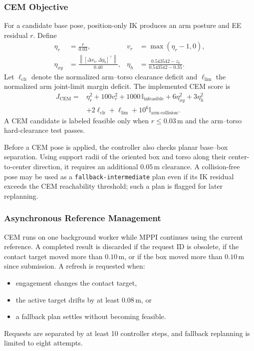 \documentclass[11pt,a4paper]{article}
\newcommand{\norm}[1]{\left\lVert #1 \right\rVert}
\newcommand{\code}[1]{\texttt{#1}}
\begin{document}
\subsubsection{CEM Objective}

For a candidate base pose, position-only IK produces an arm posture and EE
residual $r$. Define
\begin{align}
  \eta_r&=\frac{r}{0.03},&
  v_r&=\max(\eta_r-1,0),\\
  \eta_{xy}&=\frac{\norm{[\Delta x_b,\Delta y_b]^\top}}{0.40},&
  \eta_h&=\frac{0.543542-z_b}{0.543542-0.35}.
\end{align}
Let $\ell_{\mathrm{clr}}$ denote the normalized arm--torso clearance deficit
and $\ell_{\mathrm{lim}}$ the normalized arm joint-limit margin deficit. The
implemented CEM score is
\begin{equation}
\begin{split}
  J_{\mathrm{CEM}}={}&
  \eta_r^2
  +100v_r^2
  +1000\,\mathbb{I}_{\mathrm{infeasible}}
  +6\eta_{xy}^2
  +3\eta_h^2\\
  &+2\ell_{\mathrm{clr}}
  +\ell_{\mathrm{lim}}
  +10^6\mathbb{I}_{\mathrm{arm\ collision}}.
\end{split}
\end{equation}
A CEM candidate is labeled feasible only when $r\leq0.03\,\mathrm{m}$ and
the arm--torso hard-clearance test passes.

Before a CEM pose is applied, the controller also checks planar base--box
separation. Using support radii of the oriented box and torso along their
center-to-center direction, it requires an additional $0.05\,\mathrm{m}$
clearance. A collision-free pose may be used as a
\code{fallback-intermediate} plan even if its IK residual exceeds the CEM
reachability threshold; such a plan is flagged for later replanning.

\subsubsection{Asynchronous Reference Management}

CEM runs on one background worker while MPPI continues using the current
reference. A completed result is discarded if the request ID is obsolete, if
the contact target moved more than $0.10\,\mathrm{m}$, or if the box moved
more than $0.10\,\mathrm{m}$ since submission. A refresh is requested when:
\begin{itemize}
  \item engagement changes the contact target,
  \item the active target drifts by at least $0.08\,\mathrm{m}$, or
  \item a fallback plan settles without becoming feasible.
\end{itemize}
Requests are separated by at least 10 controller steps, and fallback
replanning is limited to eight attempts.
\end{document}
